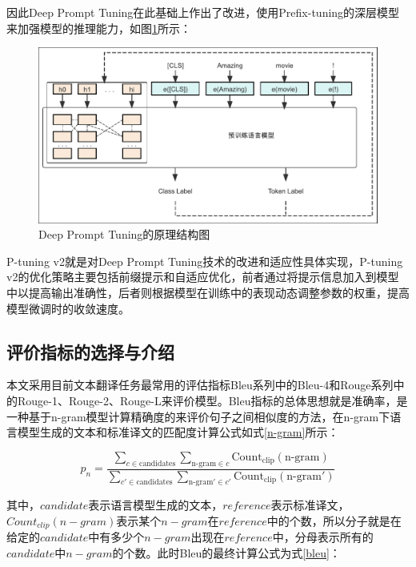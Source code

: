 \documentclass[
    decl-page,  %
    ,fontset = win, %
  ]{njuthesis}
\begin{document}
因此Deep Prompt Tuning在此基础上作出了改进，使用Prefix-tuning\cite{li2021prefix}的深层模型来加强模型的推理能力，如图\ref{Deep Prompt Tuning}所示：

\begin{figure}[ht]
  \centering
  \includegraphics[width=\textwidth]{image/P-tuning v2.pdf}
  \caption{Deep Prompt Tuning的原理结构图}
  \label{Deep Prompt Tuning}
\end{figure}

P-tuning v2就是对Deep Prompt Tuning技术的改进和适应性具体实现，P-tuning v2的优化策略主要包括前缀提示和自适应优化，前者通过将提示信息加入到模型中以提高输出准确性，后者则根据模型在训练中的表现动态调整参数的权重，提高模型微调时的收敛速度。

\subsection{评价指标的选择与介绍}
本文采用目前文本翻译任务最常用的评估指标Bleu系列\cite{papineni2002bleu}中的Bleu-4和Rouge系列\cite{lin2004rouge}中的Rouge-1、Rouge-2、Rouge-L来评价模型。Bleu指标的总体思想就是准确率，是一种基于n-gram模型计算精确度的来评价句子之间相似度的方法，在n-gram下语言模型生成的文本和标准译文的匹配度计算公式如式\ref{n-gram}所示：

\begin{equation}
\label{n-gram}
p_n = \frac{\sum_{c \in \text{candidates}} \sum_{\text{n-gram} \in c} \text{Count}_{\text{clip}}(\text{n-gram})}{\sum_{c' \in \text{candidates}} \sum_{\text{n-gram}' \in c'} \text{Count}_{\text{clip}}(\text{n-gram}')}
\end{equation}

其中，$candidate$表示语言模型生成的文本，$reference$表示标准译文，$Count_{clip}(n-gram)$表示某个$n-gram$在$reference$中的个数，所以分子就是在给定的$candidate$中有多少个$n-gram$出现在$reference$中，分母表示所有的$candidate$中$n-gram$的个数。此时Bleu的最终计算公式为式\ref{bleu}：
\end{document}
